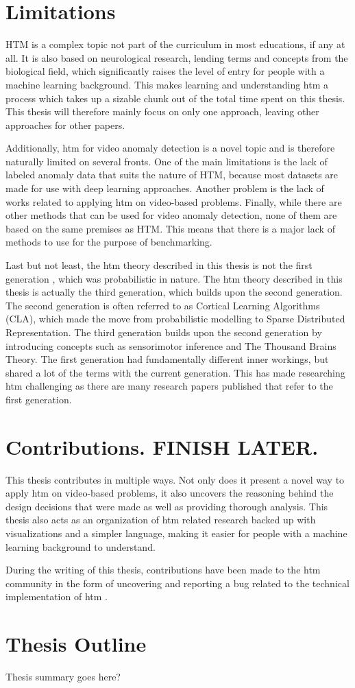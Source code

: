 \section{Limitations}
HTM is a complex topic not part of the curriculum in most educations, if any at all. It is also based on neurological research, lending terms and concepts from the biological field, which significantly raises the level of entry for people with a machine learning background. This makes learning and understanding \gls*{htm} a process which takes up a sizable chunk out of the total time spent on this thesis. This thesis will  therefore mainly focus on only one approach, leaving other approaches for other papers.\par
Additionally, \gls*{htm} for video anomaly detection is a novel topic and is therefore naturally limited on several fronts. One of the main limitations is the lack of labeled anomaly data that suits the nature of HTM, because most datasets are made for use with deep learning approaches. Another problem is the lack of works related to applying \gls*{htm} on video-based problems. Finally, while there are other methods that can be used for video anomaly detection, none of them are based on the same premises as HTM. This means that there is a major lack of methods to use for the purpose of benchmarking.
\par
Last but not least, the \gls*{htm} theory described in this thesis is not the first generation \cite{htm_zeta1}, which was probabilistic in nature. The \gls*{htm} theory described in this thesis is actually the third generation\cite{htm_gen3, thousandbrains}, which builds upon the second generation\cite{htm_gen2_sp,htm_gen2_tm}. The second generation is often referred to as Cortical Learning Algorithms (CLA), which made the move from probabilistic modelling to Sparse Distributed Representation. The third generation builds upon the second generation by introducing concepts such as sensorimotor inference and The Thousand Brains Theory. The first generation had fundamentally different inner workings, but shared a lot of the terms with the current generation. This has made researching  \gls*{htm} challenging as there are many research papers published that refer to the first generation.
\section{Contributions. FINISH LATER.}
This thesis contributes in multiple ways. Not only does it present a novel way to apply  \gls*{htm} on video-based problems, it also uncovers the reasoning behind the design decisions that were made as well as providing thorough analysis. This thesis also acts as an organization of  \gls*{htm} related research backed up with visualizations and a simpler language, making it easier for people with a machine learning background to understand.
\par
During the writing of this thesis, contributions have been made to the  \gls*{htm} community in the form of uncovering and reporting a bug related to the technical implementation of  \gls*{htm} \cite{github_contrib}.
\section{Thesis Outline}
Thesis summary goes here?
